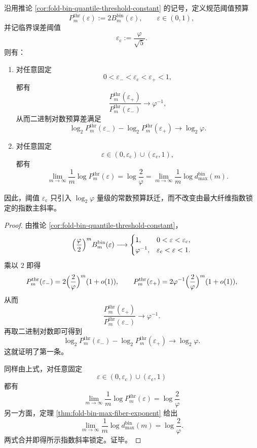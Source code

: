 \begin{theorem}\label{thm:xi-foldbin-threshold-budget-logphi-jump}
沿用推论 \ref{cor:fold-bin-quantile-threshold-constant} 的记号，定义规范阈值预算
\[
P_m^{\mathrm{thr}}(\varepsilon):=2B^{\mathrm{bin}}_m(\varepsilon),
\qquad
\varepsilon\in(0,1),
\]
并记临界误差阈值
\[
\varepsilon_{\mathrm c}:=\frac{\varphi}{\sqrt5}.
\]
则有：
\begin{enumerate}
  \item 对任意固定
  \[
  0<\varepsilon_-<\varepsilon_{\mathrm c}<\varepsilon_+<1,
  \]
  都有
  \[
  \frac{P_m^{\mathrm{thr}}(\varepsilon_+)}{P_m^{\mathrm{thr}}(\varepsilon_-)}
  \longrightarrow
  \varphi^{-1},
  \]
  从而二进制对数预算差满足
  \[
  \log_2 P_m^{\mathrm{thr}}(\varepsilon_-)
  -
  \log_2 P_m^{\mathrm{thr}}(\varepsilon_+)
  \longrightarrow
  \log_2\varphi.
  \]
  \item 对任意固定
  \[
  \varepsilon\in(0,\varepsilon_{\mathrm c})\cup(\varepsilon_{\mathrm c},1),
  \]
  都有
  \[
  \lim_{m\to\infty}\frac1m\log P_m^{\mathrm{thr}}(\varepsilon)
  =
  \log\frac{2}{\varphi}
  =
  \lim_{m\to\infty}\frac1m\log d_{\max}^{\mathrm{bin}}(m).
  \]
\end{enumerate}
因此，阈值 \(\varepsilon_{\mathrm c}\) 只引入 \(\log_2\varphi\) 量级的常数预算跃迁，而不改变由最大纤维指数锁定的指数主斜率。
\end{theorem}
\begin{proof}
由推论 \ref{cor:fold-bin-quantile-threshold-constant}，
\[
\Bigl(\frac{\varphi}{2}\Bigr)^m B^{\mathrm{bin}}_m(\varepsilon)\longrightarrow
\begin{cases}
1,& 0<\varepsilon<\varepsilon_{\mathrm c},\\
\varphi^{-1},& \varepsilon_{\mathrm c}<\varepsilon<1.
\end{cases}
\]
乘以 \(2\) 即得
\[
P_m^{\mathrm{thr}}(\varepsilon_-)
=
2\Bigl(\frac{2}{\varphi}\Bigr)^m(1+o(1)),
\qquad
P_m^{\mathrm{thr}}(\varepsilon_+)
=
2\varphi^{-1}\Bigl(\frac{2}{\varphi}\Bigr)^m(1+o(1)),
\]
从而
\[
\frac{P_m^{\mathrm{thr}}(\varepsilon_+)}{P_m^{\mathrm{thr}}(\varepsilon_-)}
\longrightarrow
\varphi^{-1}.
\]
再取二进制对数即可得到
\[
\log_2 P_m^{\mathrm{thr}}(\varepsilon_-)
-
\log_2 P_m^{\mathrm{thr}}(\varepsilon_+)
\longrightarrow
\log_2\varphi.
\]
这就证明了第一条。

同样由上式，对任意固定
\[
\varepsilon\in(0,\varepsilon_{\mathrm c})\cup(\varepsilon_{\mathrm c},1)
\]
都有
\[
\lim_{m\to\infty}\frac1m\log P_m^{\mathrm{thr}}(\varepsilon)
=
\log\frac{2}{\varphi}
\]
另一方面，定理 \ref{thm:fold-bin-max-fiber-exponent} 给出
\[
\lim_{m\to\infty}\frac1m\log d_{\max}^{\mathrm{bin}}(m)
=
\log\frac{2}{\varphi}.
\]
两式合并即得所示指数斜率锁定。证毕。
\end{proof}

